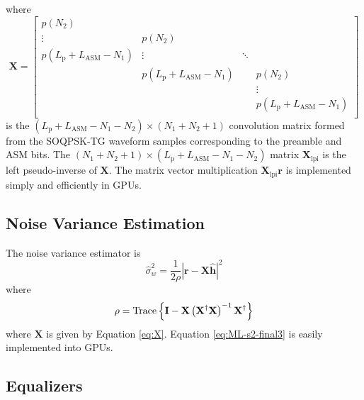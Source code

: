 where 
\begin{equation}
\mathbf{X} = 
		\begin{bmatrix}
		p(N_2)							& 								& 		&  			\\
		\vdots 							& p(N_2)						& 		&  			\\
		p(L_\text{p}+L_\text{ASM}-N_1)	&\vdots							& \ddots&  			\\
										& p(L_\text{p}+L_\text{ASM}-N_1)&  		& p(N_2)  	\\
		 								&  								&  		& \vdots 	\\
		 								&  	   							&  		& p(L_\text{p}+L_\text{ASM}-N_1)\\
	\end{bmatrix}
	\label{eq:X}
\end{equation}
is the $(L_\text{p}+L_\text{ASM}-N_1-N_2)\times(N_1+N_2+1)$ convolution matrix formed from 
the SOQPSK-TG waveform samples corresponding to the preamble and ASM bits.
The $(N_1+N_2+1)\times(L_\text{p}+L_\text{ASM}-N_1-N_2)$ matrix $\mathbf{X}_\text{lpi}$ is the left pseudo-inverse of $\mathbf{X}$.
The matrix vector multiplication $\mathbf{X}_\text{lpi} \mathbf{r}$ is implemented simply and efficiently in GPUs.


\subsection{Noise Variance Estimation}
\label{sec:noise_variance_estimation}
The noise variance estimator is \cite[eq. 9]{rice-afran-saquib-cole-rhodes-moazzami:2014}
\begin{equation}
	\hat{\sigma}_w^2 = \frac{1}{2\rho} \left| \mathbf{r}-\mathbf{X}\hat{\mathbf{h}}\right|^2
	\label{eq:ML-s2-final3}
\end{equation}
where
\begin{equation}
	\rho = {\rm Trace} \left\{ \mathbf{I} -  \mathbf{X}\left(\mathbf{X}^\dag\mathbf{X}\right)^{-1}\mathbf{X}^\dag \right\}
\end{equation}
where $\mathbf{X}$ is given by Equation \eqref{eq:X}.
Equation \eqref{eq:ML-s2-final3} is easily implemented into GPUs.

\subsection{Equalizers}

